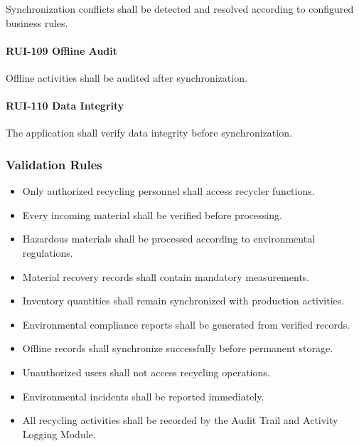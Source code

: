 Synchronization conflicts shall be detected and resolved according to
configured business rules.

\paragraph{RUI-109 Offline Audit}

Offline activities shall be audited after synchronization.

\paragraph{RUI-110 Data Integrity}

The application shall verify data integrity before synchronization.


\subsubsection*{Validation Rules}

\begin{itemize}

\item Only authorized recycling personnel shall access recycler
functions.

\item Every incoming material shall be verified before processing.

\item Hazardous materials shall be processed according to environmental
regulations.

\item Material recovery records shall contain mandatory measurements.

\item Inventory quantities shall remain synchronized with production
activities.

\item Environmental compliance reports shall be generated from verified
records.

\item Offline records shall synchronize successfully before permanent
storage.

\item Unauthorized users shall not access recycling operations.

\item Environmental incidents shall be reported immediately.

\item All recycling activities shall be recorded by the Audit Trail and
Activity Logging Module.

\end{itemize}

